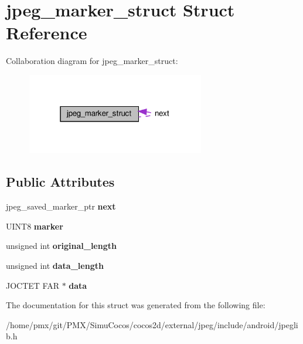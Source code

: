 \hypertarget{structjpeg__marker__struct}{}\section{jpeg\+\_\+marker\+\_\+struct Struct Reference}
\label{structjpeg__marker__struct}


Collaboration diagram for jpeg\+\_\+marker\+\_\+struct\+:
\nopagebreak
\begin{figure}[H]
\begin{center}
\leavevmode
\includegraphics[width=220pt]{structjpeg__marker__struct__coll__graph}
\end{center}
\end{figure}
\subsection*{Public Attributes}
\begin{DoxyCompactItemize}
\item 
\mbox{\label{structjpeg__marker__struct_a1cb619806ea91b42a46b2a04fafabd82}} 
jpeg\+\_\+saved\+\_\+marker\+\_\+ptr {\bfseries next}
\item 
\mbox{\label{structjpeg__marker__struct_a154cf70fc9b4f86da631ca08a12a8d33}} 
U\+I\+N\+T8 {\bfseries marker}
\item 
\mbox{\label{structjpeg__marker__struct_a3b17d58a17fa6be8560b697da814dfd3}} 
unsigned int {\bfseries original\+\_\+length}
\item 
\mbox{\label{structjpeg__marker__struct_a98412e9bccde6954ce55f611ad146a6b}} 
unsigned int {\bfseries data\+\_\+length}
\item 
\mbox{\label{structjpeg__marker__struct_a3d91d1b1c95f2d039d17209484fd7a91}} 
J\+O\+C\+T\+ET F\+AR $\ast$ {\bfseries data}
\end{DoxyCompactItemize}


The documentation for this struct was generated from the following file\+:\begin{DoxyCompactItemize}
\item 
/home/pmx/git/\+P\+M\+X/\+Simu\+Cocos/cocos2d/external/jpeg/include/android/jpeglib.\+h\end{DoxyCompactItemize}
